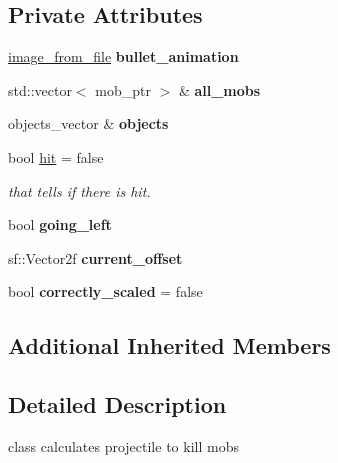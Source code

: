 \subsection*{Private Attributes}
\begin{DoxyCompactItemize}
\item 
\mbox{\label{classbullet_a112af2b0e62f62dbe4d31fdd726c760b}} 
\hyperlink{classimage__from__file}{image\+\_\+from\+\_\+file} {\bfseries bullet\+\_\+animation}
\item 
\mbox{\label{classbullet_a8730572b757fc9d664fb3ce640a797ce}} 
std\+::vector$<$ mob\+\_\+ptr $>$ \& {\bfseries all\+\_\+mobs}
\item 
\mbox{\label{classbullet_a93b79bed80ce59b86e3fd332d0c03c5c}} 
objects\+\_\+vector \& {\bfseries objects}
\item 
\mbox{\label{classbullet_aa8ad03cdacad1e53dedf55b0719b8980}} 
bool \hyperlink{classbullet_aa8ad03cdacad1e53dedf55b0719b8980}{hit} = false
\begin{DoxyCompactList}\small\item\em that tells if there is hit. \end{DoxyCompactList}\item 
\mbox{\label{classbullet_a5827b4585bf299481273f49049a0f46f}} 
bool {\bfseries going\+\_\+left}
\item 
\mbox{\label{classbullet_af59d163e270aa74ebc5fafe6146400bc}} 
sf\+::\+Vector2f {\bfseries current\+\_\+offset}
\item 
\mbox{\label{classbullet_a0ee7ce5c4876f81b0df0a9979c54e68b}} 
bool {\bfseries correctly\+\_\+scaled} = false
\end{DoxyCompactItemize}
\subsection*{Additional Inherited Members}


\subsection{Detailed Description}
class calculates projectile to kill mobs 

